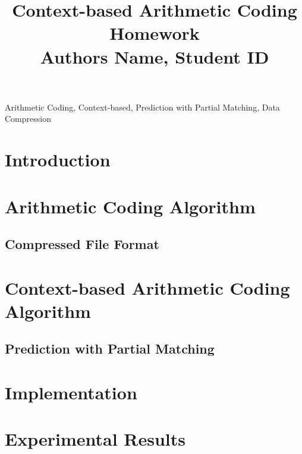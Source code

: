 \documentclass[a4paper,conference]{IEEEtran}
\begin{document}
\renewcommand\footnoterule{{\hrule height 0.5pt}\vspace{0.04in}}
\def\IEEEkeywordsname{Keywords}

\title{Context-based Arithmetic Coding Homework\\
\vspace{-0.1in}
{\normalsize Authors Name, Student ID}
}

\author{}

\maketitle

\vspace{0.1in}

\begin{IEEEkeywords}
Arithmetic Coding, Context-based, Prediction with Partial Matching, Data Compression
\end{IEEEkeywords}

\section{Introduction}


\section{Arithmetic Coding Algorithm}



\subsection{Compressed File Format}



\section{Context-based Arithmetic Coding Algorithm}


\subsection{Prediction with Partial Matching}

\section{Implementation}


\section{Experimental Results}
\end{document}
